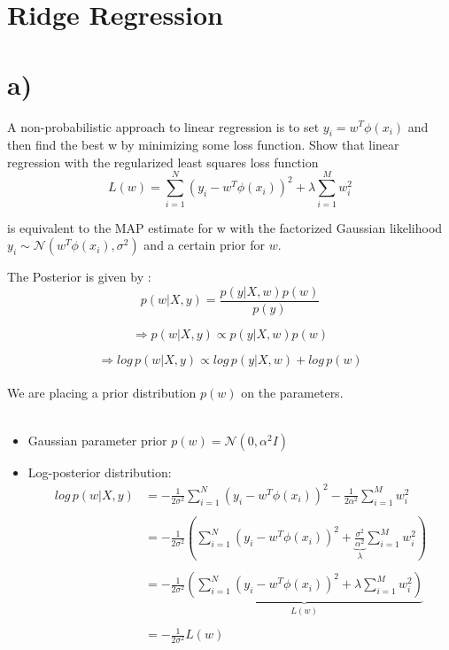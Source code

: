 \documentclass[12pt,twoside]{article}
\begin{document}
\section{Ridge Regression}
\section*{a)} A non-probabilistic approach to linear regression is to set $y_i = w^T \phi(x_i)$ and then find the best w by minimizing some loss function. Show that linear regression with the regularized least squares loss function 
\begin{equation*}
L(w) =  \sum_{i=1}^{N} \left(y_i - w^T \phi(x_i)\right)^2 + \lambda \sum_{i=1}^{M} w_i^2
\end{equation*}

is equivalent to the MAP estimate for w with the factorized Gaussian likelihood $y_i \sim \mathcal{N}(w^T \phi(x_i), \sigma^2)$ and a certain prior for $w$.

The Posterior is given by :
\begin{equation*}
p(w|X,y) = \frac{p(y|X,w)p(w)}{p(y)}
\end{equation*}

\begin{equation*}
\Longrightarrow p(w|X,y) \propto p(y|X,w)p(w)
\end{equation*}

\begin{equation*}
\Longrightarrow log\,p(w|X,y) \propto log\, p(y|X,w) + log\,p(w)
\end{equation*}\\
We are placing a prior distribution $p(w)$ on the parameters.\\ \\

\begin{itemize}
	\item Gaussian parameter prior $p(w) = \mathcal{N}(0,\alpha^2I)$
	\item Log-posterior distribution:
	\begin{align*}
log\,p(w|X,y) &= - \frac{1}{2\sigma^2}\sum_{i=1}^{N} \left(y_i - w^T \phi(x_i)\right)^2 - \frac{1}{2\alpha^2} \sum_{i=1}^{M} w_i^2 \\ \\
			  &= - \frac{1}{2\sigma^2} \left(\sum_{i=1}^{N} \left(y_i - w^T \phi(x_i)\right)^2 + \underbrace{\frac{\sigma^2}{\alpha^2}}_{\lambda} \sum_{i=1}^{M} w_i^2 \right) \\ \\
			  &= - \frac{1}{2\sigma^2} \underbrace{\left(\sum_{i=1}^{N} \left(y_i - w^T \phi(x_i)\right)^2 + \lambda \sum_{i=1}^{M} w_i^2 \right)}_{L(w)} \\ \\
			  &= - \frac{1}{2\sigma^2} L(w)
	\end{align*}
\end{itemize}
\end{document}
